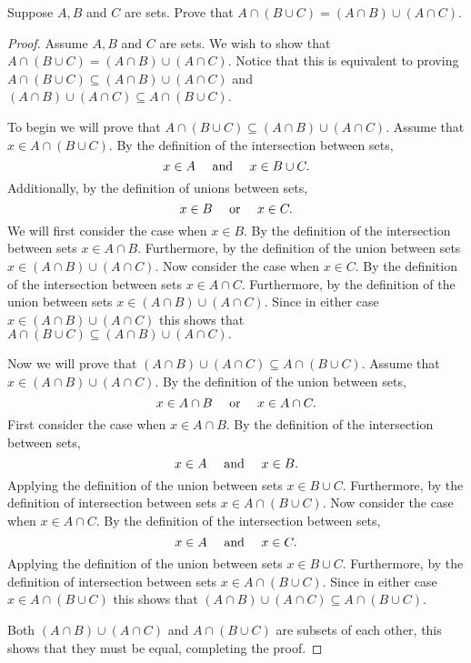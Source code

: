 \documentclass{report}
\begin{document}
\begin{proposition}{}{}
  Suppose $A, B$ and $C$ are sets.
  Prove that $A \cap \left(B \cup C \right) = \left(A \cap B \right) \cup \left(A \cap C\right)$.
\end{proposition}

\begin{proof}
  Assume $A, B$ and $C$ are sets.
  We wish to show that $A \cap \left(B \cup C \right) = \left(A \cap B \right) \cup \left(A \cap C\right)$.
  Notice that this is equivalent to proving $A \cap \left(B \cup C \right) \subseteq \left(A \cap B \right) \cup \left(A \cap C\right)$ and $\left(A \cap B \right) \cup \left(A \cap C\right) \subseteq A \cap \left(B \cup C \right)$.

  To begin we will prove that $A \cap \left(B \cup C\right) \subseteq \left(A \cap B\right) \cup \left(A \cap C\right)$.
  Assume that $x \in A \cap \left(B \cup C\right)$.
  By the definition of the intersection between sets, $$x \in A \quad \text{ and } \quad x \in B \cup C.$$
  Additionally, by the definition of unions between sets, $$x \in B \quad \text{ or } \quad x \in C.$$
  We will first consider the case when $x \in B$.
  By the definition of the intersection between sets $x \in A \cap B$.
  Furthermore, by the definition of the union between sets $x \in \left(A \cap B\right) \cup \left(A \cap C\right)$.
  Now consider the case when $x \in C$.
  By the definition of the intersection between sets $x \in A \cap C$.
  Furthermore, by the definition of the union between sets $x \in \left(A \cap B\right) \cup \left(A \cap C\right)$.
  Since in either case $x \in \left(A \cap B\right) \cup \left(A \cap C\right)$ this shows that $A \cap \left(B \cup C\right) \subseteq \left(A \cap B\right) \cup \left(A \cap C\right).$

  Now we will prove that $\left(A \cap B\right) \cup \left(A \cap C\right) \subseteq A \cap \left(B \cup C\right)$.
  Assume that $x \in \left(A \cap B\right) \cup \left(A \cap C\right)$.
  By the definition of the union between sets, $$x \in A \cap B \quad \text{ or } \quad x \in A \cap C.$$
  First consider the case when $x \in A \cap B$.
  By the definition of the intersection between sets, $$x \in A \quad \text{ and } \quad x \in B.$$
  Applying the definition of the union between sets $x \in B \cup C$.
  Furthermore, by the definition of intersection between sets $x \in A \cap \left(B \cup C\right)$.
  Now consider the case when $x \in A \cap C$.
  By the definition of the intersection between sets, $$x \in A \quad \text{ and } \quad x \in C.$$
  Applying the definition of the union between sets $x \in B \cup C$.
  Furthermore, by the definition of intersection between sets $x \in A \cap \left(B \cup C\right)$.
  Since in either case $x \in A \cap \left(B \cup C\right)$ this shows that $\left(A \cap B\right) \cup \left(A \cap C\right) \subseteq A \cap \left(B \cup C\right)$.

  Both $\left(A \cap B\right) \cup \left(A \cap C\right)$ and $A \cap \left(B \cup C\right)$ are subsets of each other, this shows that they must be equal, completing the proof.
\end{proof}
\end{document}
